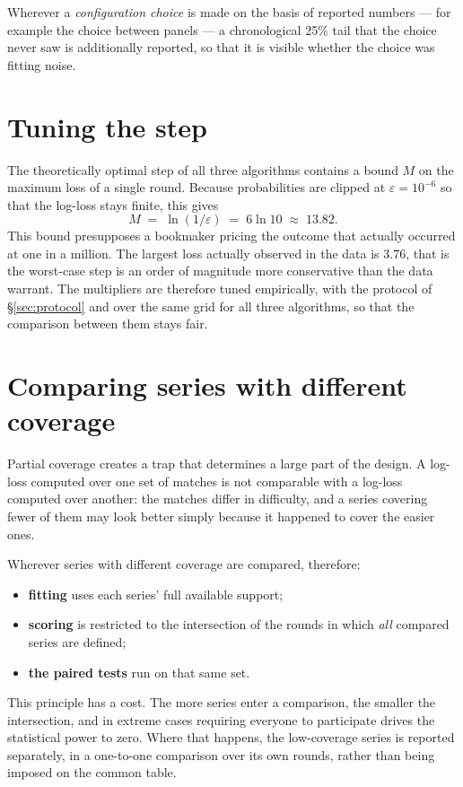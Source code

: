 \documentclass[12pt,a4paper,oneside]{report}
\renewcommand{\_}{\oldunderscore\allowbreak}
\theoremstyle{definition}
\theoremstyle{plain}
\theoremstyle{remark}
\begin{document}
Wherever a \emph{configuration choice} is made on the basis of reported numbers --- for example
the choice between panels --- a chronological 25\% tail that the choice never saw is additionally
reported, so that it is visible whether the choice was fitting noise.

\section{Tuning the step}

The theoretically optimal step of all three algorithms contains a bound $M$ on the maximum loss
of a single round. Because probabilities are clipped at $\varepsilon = 10^{-6}$ so that the
log-loss stays finite, this gives
\[
M \;=\; \ln(1/\varepsilon) \;=\; 6\ln 10 \;\approx\; 13.82 .
\]
This bound presupposes a bookmaker pricing the outcome that actually occurred at one in a
million. The largest loss actually observed in the data is 3.76, that is the worst-case step is
an order of magnitude more conservative than the data warrant. The multipliers are therefore
tuned empirically, with the protocol of \S\ref{sec:protocol} and over the same grid for all three
algorithms, so that the comparison between them stays fair.

\section{Comparing series with different coverage}
\label{sec:common-rounds}

Partial coverage creates a trap that determines a large part of the design. A log-loss computed
over one set of matches is not comparable with a log-loss computed over another: the matches
differ in difficulty, and a series covering fewer of them may look better simply because it
happened to cover the easier ones.

Wherever series with different coverage are compared, therefore:

\begin{itemize}
  \item \textbf{fitting} uses each series' full available support;
  \item \textbf{scoring} is restricted to the intersection of the rounds in which \emph{all}
        compared series are defined;
  \item \textbf{the paired tests} run on that same set.
\end{itemize}

This principle has a cost. The more series enter a comparison, the smaller the intersection, and
in extreme cases requiring everyone to participate drives the statistical power to zero. Where
that happens, the low-coverage series is reported separately, in a one-to-one comparison over its
own rounds, rather than being imposed on the common table.
\end{document}

